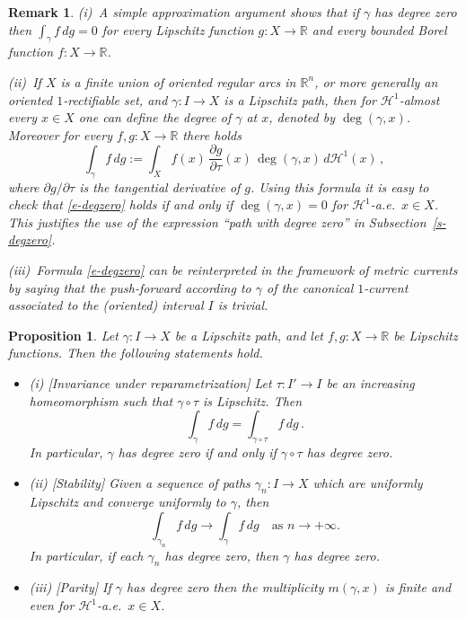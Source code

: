 \documentclass[11pt,reqno,a4paper,final]{amsart}
\numberwithin{equation}{section}
\theoremstyle{mytheorem}
\newtheorem{proposition}[subsection]{Proposition}
\theoremstyle{myremark}
\newtheorem{remark}[subsection]{Remark}
\theoremstyle{myparagraph}
\newenvironment{itemizeb}
{\begin{itemize}\itemsep=2pt\leftskip -5 pt}
{\end{itemize}}
\newcommand{\R}{\mathbb{R}}
\newcommand{\Haus}{\mathscr{H}}
\newcommand{\bd}{\partial}
\begin{document}
\begin{remark}
\label{s-degzerorem}
(i)~A simple approximation argument shows that 
if $\gamma$ has degree zero then $\int_\gamma f \, dg = 0$
for every Lipschitz function $g:X\to\R$ and every bounded 
Borel function $f:X\to\R$.

\smallskip
(ii)~If $X$ is a finite union of oriented regular arcs in $\R^n$, 
or more generally an oriented $1$-rectifiable set, 
and $\gamma:I\to X$ is a Lipschitz path, then 
for $\Haus^1$-almost every $x\in X$ one can define the 
degree of $\gamma$ at $x$, denoted by
$\deg(\gamma,x)$.
Moreover for every $f,g:X\to\R$ there holds
%
\begin{equation}
\label{e-orientedareaformula}
\int_\gamma f \, dg
:= \int_X f(x) \, \frac{\bd g}{\bd\tau}(x) 
          \, \deg(\gamma,x) \, d\Haus^1(x)
\, , 
\end{equation}
%
where $\bd g/\bd\tau$ is the tangential derivative 
of $g$.
Using this formula it is easy to check that \eqref{e-degzero}
holds if and only if $\deg(\gamma,x)=0$ for $\Haus^1$-a.e.~$x\in X$.
This justifies the use of the expression ``path with degree zero''
in Subsection~\ref{s-degzero}.

\smallskip
(iii)~Formula \eqref{e-degzero} can be reinterpreted in the framework
of metric currents by saying that the push-forward according to 
$\gamma$ of the canonical $1$-current associated to the (oriented) 
interval $I$ is trivial.
\end{remark}
 
\begin{proposition}
\label{s-degzeroprop}
Let $\gamma:I\to X$ be a Lipschitz path, and let $f,g:X\to\R$ 
be Lipschitz functions. Then the following statements hold.
%
\begin{itemizeb}
\item[(i)]
\emph{[Invariance under reparametrization]}
Let $\tau:I'\to I$ be an increasing homeomorphism
such that $\gamma\circ\tau$ is Lipschitz.
Then 
%
\begin{equation}
\label{e-invariance}
\int_\gamma f \, dg = \int_{\gamma\circ\tau} f \, dg 
\, .
\end{equation}
%
In particular, $\gamma$ has degree zero 
if and only if $\gamma\circ\tau$ has degree zero.
%
\item[(ii)]
\emph{[Stability]}
Given a sequence of paths $\gamma_n:I\to X$ 
which are uniformly Lipschitz and converge uniformly to $\gamma$, 
then 
\[
\int_{\gamma_n} f \, dg  \to \int_\gamma f \, dg 
\quad\text{as $n\to+\infty$.}
\]
In particular, if each $\gamma_n$ has degree zero, 
then $\gamma$ has degree zero.
%
\item[(iii)]
\emph{[Parity]}
If $\gamma$ has degree zero then the multiplicity 
$m(\gamma,x)$ is finite and even 
for $\Haus^1$-a.e.~$x\in X$.
\end{itemizeb}
%
\end{proposition}
\end{document}
